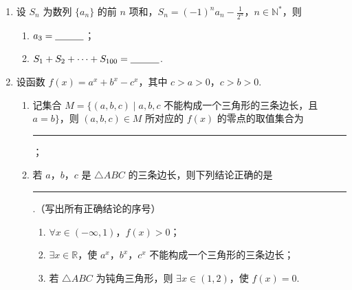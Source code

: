\begin{description}
\begin{enumerate}[leftmargin=5pt]
        \item 设 \(S_{n}\) 为数列 \(\{a_{n}\}\) 的前 \(n\) 项和，\(S_{n} = (-1)^{n}a_{n} - \frac{1}{2^{n}}\)，\(n \in \mathbb{N}^{*}\)，则
\begin{enumerate}
\item \(a_{3} =\rule[-0.3ex]{3em}{0.4pt}\)；
\item \(S_{1} + S_{2} + \dots + S_{100} =\rule[-0.3ex]{3em}{0.4pt}\).
\end{enumerate}

        \item 设函数 \(f(x) = a^x + b^x - c^x\)，其中 \(c > a > 0\)，\(c > b > 0\).
\begin{enumerate}
\item 记集合 \(M = \{(a, b, c) \mid a, b, c\) 不能构成一个三角形的三条边长，且 \(a = b\}\)，则 \((a, b, c) \in M\) 所对应的 \(f(x)\) 的零点的取值集合为\rule[-0.3ex]{3em}{0.4pt}；
\item 若 \(a\)，\(b\)，\(c\) 是 \(\triangle ABC\) 的三条边长，则下列结论正确的是\rule[-0.3ex]{3em}{0.4pt}.（写出所有正确结论的序号）
\begin{enumerate}
\item \(\forall x \in (-\infty, 1)\)，\(f(x) > 0\)；
\item \(\exists x \in \mathbb{R}\)，使 \(a^{x}\)，\(b^{x}\)，\(c^{x}\) 不能构成一个三角形的三条边长；
\item 若 \(\triangle ABC\) 为钝角三角形，则 \(\exists x \in (1, 2)\)，使 \(f(x) = 0\).
\end{enumerate}
\end{enumerate}

    \end{enumerate}

\end{description}

